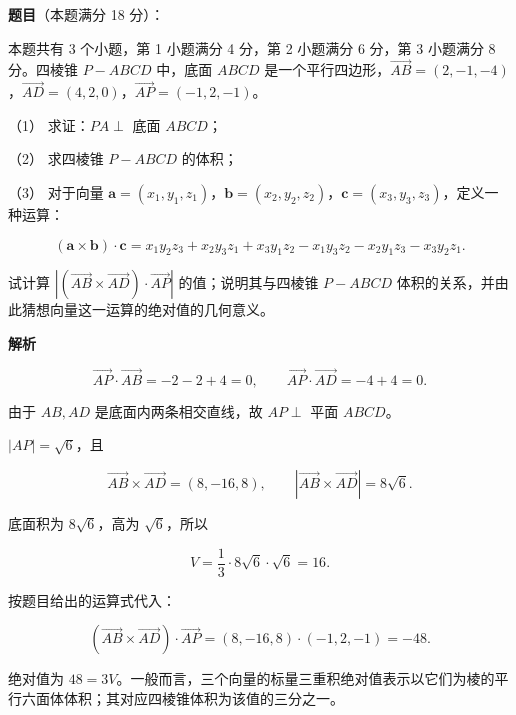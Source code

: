 \begin{answer}

\textbf{题目}（本题满分 18 分）：

本题共有 3 个小题，第 1 小题满分 4 分，第 2 小题满分 6 分，第 3 小题满分 8 分。四棱锥 $P-ABCD$ 中，底面 $ABCD$ 是一个平行四边形，$\overrightarrow{AB}=(2,-1,-4)$，$\overrightarrow{AD}=(4,2,0)$，$\overrightarrow{AP}=(-1,2,-1)$。

（1） 求证：$PA\perp$ 底面 $ABCD$；

（2） 求四棱锥 $P-ABCD$ 的体积；

（3） 对于向量 $\mathbf{a}=(x_1,y_1,z_1)$，$\mathbf{b}=(x_2,y_2,z_2)$，$\mathbf{c}=(x_3,y_3,z_3)$，定义一种运算：

\nopagebreak[4]
\[
(\mathbf{a}\times\mathbf{b})\cdot\mathbf{c}=x_1y_2z_3+x_2y_3z_1+x_3y_1z_2-x_1y_3z_2-x_2y_1z_3-x_3y_2z_1.
\]

试计算 $\left|(\overrightarrow{AB}\times\overrightarrow{AD})\cdot\overrightarrow{AP}\right|$ 的值；说明其与四棱锥 $P-ABCD$ 体积的关系，并由此猜想向量这一运算的绝对值的几何意义。

\textbf{解析}


\nopagebreak[4]
\[
\overrightarrow{AP}\cdot\overrightarrow{AB}=-2-2+4=0,\qquad
\overrightarrow{AP}\cdot\overrightarrow{AD}=-4+4=0.
\]

由于 $AB,AD$ 是底面内两条相交直线，故 $AP\perp$ 平面 $ABCD$。


$|AP|=\sqrt6$，且

\nopagebreak[4]
\[
\overrightarrow{AB}\times\overrightarrow{AD}=(8,-16,8),\qquad
|\overrightarrow{AB}\times\overrightarrow{AD}|=8\sqrt6.
\]

底面积为 $8\sqrt6$，高为 $\sqrt6$，所以

\nopagebreak[4]
\[
V=\frac13\cdot8\sqrt6\cdot\sqrt6=16.
\]


按题目给出的运算式代入：

\nopagebreak[4]
\[
(\overrightarrow{AB}\times\overrightarrow{AD})\cdot\overrightarrow{AP}
=(8,-16,8)\cdot(-1,2,-1)=-48.
\]

绝对值为 $48=3V$。一般而言，三个向量的标量三重积绝对值表示以它们为棱的平行六面体体积；其对应四棱锥体积为该值的三分之一。




\end{answer}
